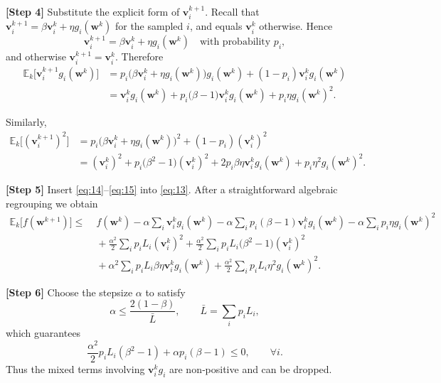 \documentclass[11pt]{article}
\newcommand{\E}{\mathbb{E}}
\begin{document}
\noindent\textbf{[Step 4]}   Substitute the explicit form of $\mathbf v^{k+1}_{i}$.
Recall that $\mathbf v^{k+1}_{i}= \beta\mathbf v^{k}_{i}+ \eta g_i(\mathbf w^{k})$ for the sampled $i$, and equals $\mathbf v^{k}_{i}$ otherwise.
Hence
\[
\mathbf v^{k+1}_{i}
= \beta\mathbf v^{k}_{i}+ \eta g_i(\mathbf w^{k})\quad\text{with probability }p_i,
\]
and otherwise $\mathbf v^{k+1}_{i}= \mathbf v^{k}_{i}$.  Therefore
\[
\begin{aligned}
\E_{k}\!\bigl[\mathbf v^{k+1}_{i}g_i(\mathbf w^{k})\bigr]
&= p_i\bigl(\beta\mathbf v^{k}_{i}+ \eta g_i(\mathbf w^{k})\bigr)g_i(\mathbf w^{k})
   +(1-p_i)\mathbf v^{k}_{i}g_i(\mathbf w^{k})\\
&= \mathbf v^{k}_{i}g_i(\mathbf w^{k})
   +p_i\bigl(\beta-1\bigr)\mathbf v^{k}_{i}g_i(\mathbf w^{k})
   +p_i\eta g_i(\mathbf w^{k})^{2}.
\end{aligned}
\tag{14}
\]

Similarly,
\[
\begin{aligned}
\E_{k}\!\bigl[(\mathbf v^{k+1}_{i})^{2}\bigr]
&= p_i\bigl(\beta\mathbf v^{k}_{i}+ \eta g_i(\mathbf w^{k})\bigr)^{2}
   +(1-p_i)(\mathbf v^{k}_{i})^{2}\\
&= (\mathbf v^{k}_{i})^{2}
   +p_i\bigl(\beta^{2}-1\bigr)(\mathbf v^{k}_{i})^{2}
   +2p_i\beta\eta \mathbf v^{k}_{i} g_i(\mathbf w^{k})
   +p_i\eta^{2}g_i(\mathbf w^{k})^{2}.
\end{aligned}
\tag{15}
\]

\noindent\textbf{[Step 5]}   Insert \eqref{eq:14}–\eqref{eq:15} into \eqref{eq:13}.
After a straightforward algebraic regrouping we obtain
\[
\begin{aligned}
\E_{k}\!\bigl[f(\mathbf w^{k+1})\bigr]
\le &\; f(\mathbf w^{k})
   -\alpha\!\sum_{i}\!\mathbf v^{k}_{i} g_i(\mathbf w^{k})
   -\alpha\!\sum_{i}p_i(\beta-1)\mathbf v^{k}_{i} g_i(\mathbf w^{k})
   -\alpha\!\sum_{i}p_i\eta g_i(\mathbf w^{k})^{2}\\
   &\;+\frac{\alpha^{2}}{2}\!\sum_{i}p_i L_i(\mathbf v^{k}_{i})^{2}
   +\frac{\alpha^{2}}{2}\!\sum_{i}p_i L_i\bigl(\beta^{2}-1\bigr)(\mathbf v^{k}_{i})^{2}\\
   &\;+\alpha^{2}\!\sum_{i}p_i L_i\beta\eta \mathbf v^{k}_{i} g_i(\mathbf w^{k})
   +\frac{\alpha^{2}}{2}\!\sum_{i}p_i L_i\eta^{2}g_i(\mathbf w^{k})^{2}.
\end{aligned}
\tag{16}
\]

\noindent\textbf{[Step 6]}   Choose the stepsize $\alpha$ to satisfy
\[
\alpha\le\frac{2(1-\beta)}{\bar L},
\qquad\bar L=\sum_{i}p_iL_i,
\tag{17}
\]
which guarantees
\[
\frac{\alpha^{2}}{2}p_iL_i(\beta^{2}-1)+\alpha p_i(\beta-1)\le0,
\qquad\forall i.
\tag{18}
\]
Thus the mixed terms involving $\mathbf v^{k}_{i}g_i$ are non‑positive and can be dropped.
\end{document}
